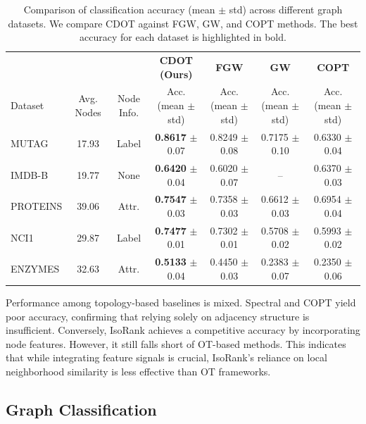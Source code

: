 \documentclass{article}
\theoremstyle{plain}
\theoremstyle{definition}
\theoremstyle{remark}
\begin{document}
\begin{table}[t]
	\centering
	\setlength{\tabcolsep}{3.9pt}
	\caption{Comparison of classification accuracy (mean $\pm$ std) across different graph datasets. We compare CDOT against FGW, GW, and COPT methods. The best accuracy for each dataset is highlighted in bold.}
	\label{tab:graph-classification-results}
	\renewcommand{\arraystretch}{1.2}
	\begin{tabular}{lcccccc}
		\toprule
		& & & \multicolumn{1}{c}{\textbf{CDOT (Ours)}} & \multicolumn{1}{c}{\textbf{FGW}} & \multicolumn{1}{c}{\textbf{GW}} & \multicolumn{1}{c}{\textbf{COPT}} \\
		Dataset & Avg. Nodes & Node Info. & Acc. (mean $\pm$ std) & Acc. (mean $\pm$ std) & Acc. (mean $\pm$ std) & Acc. (mean $\pm$ std) \\
		\midrule
		MUTAG    & 17.93 & Label & \textbf{0.8617} $\pm$ 0.07 & 0.8249 $\pm$ 0.08 & 0.7175 $\pm$ 0.10 & 0.6330 $\pm$ 0.04 \\
		IMDB-B   & 19.77 & None  & \textbf{0.6420} $\pm$ 0.04 & 0.6020 $\pm$ 0.07 &          --       & 0.6370 $\pm$ 0.03 \\
		PROTEINS & 39.06 & Attr. & \textbf{0.7547} $\pm$ 0.03 & 0.7358 $\pm$ 0.03 & 0.6612 $\pm$ 0.03 & 0.6954 $\pm$ 0.04 \\
		NCI1     & 29.87 & Label & \textbf{0.7477} $\pm$ 0.01 & 0.7302 $\pm$ 0.01 & 0.5708 $\pm$ 0.02 & 0.5993 $\pm$ 0.02 \\
		ENZYMES  & 32.63 & Attr. & \textbf{0.5133} $\pm$ 0.04 & 0.4450 $\pm$ 0.03 & 0.2383 $\pm$ 0.07 & 0.2350 $\pm$ 0.06 \\
		\bottomrule	
	\end{tabular}\vspace{-4mm}
\end{table}

Performance among topology-based baselines is mixed. Spectral and COPT yield poor accuracy, confirming that relying solely on adjacency structure is insufficient. Conversely, IsoRank achieves a competitive accuracy by incorporating node features. However, it still falls short of OT-based methods. This indicates that while integrating feature signals is crucial, IsoRank's reliance on local neighborhood similarity is less effective than OT frameworks.

\subsection{Graph Classification}
\end{document}
